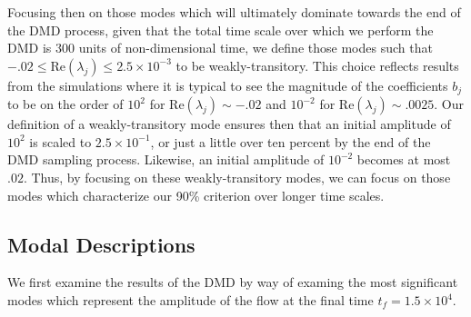 \documentclass[a4paper,11pt]{article}
\begin{document}
Focusing then on those modes which will ultimately dominate towards the end of the DMD process, given that the total time scale over which we perform the DMD is $300$ units of non-dimensional time, we define those modes such that $-.02\leq \mbox{Re}\left(\lambda_{j}\right)\leq 2.5\times 10^{-3}$ to be weakly-transitory.  This choice reflects results from the simulations where it is typical to see the magnitude of the coefficients $b_{j}$ to be on the order of $10^{2}$ for $\mbox{Re}\left(\lambda_{j}\right)\sim -.02$ and $10^{-2}$ for $\mbox{Re}\left(\lambda_{j}\right)\sim .0025$.  Our definition of a weakly-transitory mode ensures then that an initial amplitude of $10^{2}$ is scaled to $2.5\times 10^{-1}$, or just a little over ten percent by the end of the DMD sampling process.  Likewise, an initial amplitude of $10^{-2}$ becomes at most $.02$.  Thus, by focusing on these weakly-transitory modes, we can focus on those modes which characterize our 90\% criterion over longer time scales.  
\subsection*{Modal Descriptions}
We first examine the results of the DMD by way of examing the most significant modes which represent the amplitude of the flow at the final time $t_{f}=1.5\times10^{4}$.  
\end{document}
